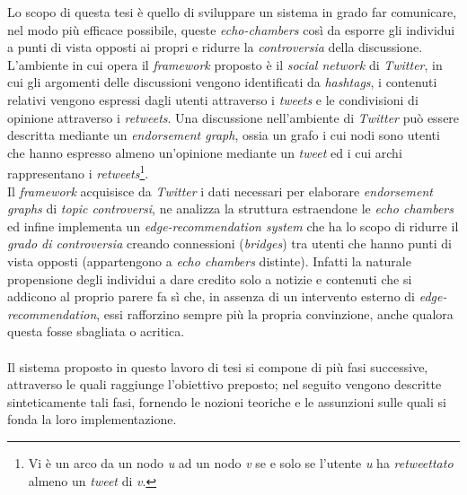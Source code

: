 Lo scopo di questa tesi è quello di sviluppare un sistema in grado far comunicare, nel modo più efficace possibile, queste \textit{echo-chambers} così da esporre gli individui a punti di vista opposti ai propri e ridurre la \textit{controversia} della discussione. L'ambiente in cui opera il \textit{framework} proposto è il \textit{social network} di \textit{Twitter}, in cui gli argomenti delle discussioni vengono identificati da \textit{hashtags}, i contenuti relativi vengono espressi dagli utenti attraverso i \textit{tweets} e le condivisioni di opinione attraverso i \textit{retweets}. Una discussione nell'ambiente di \textit{Twitter} può essere descritta mediante un \textit{endorsement graph}, ossia un grafo i cui nodi sono utenti che hanno espresso almeno un'opinione mediante un \textit{tweet} ed i cui archi rappresentano i \textit{retweets}\footnote{Vi è un arco da un nodo \textit{u} ad un nodo \textit{v} se e solo se l'utente \textit{u} ha \textit{retweettato} almeno un \textit{tweet} di \textit{v}.}.\\Il \textit{framework} acquisisce da \textit{Twitter} i dati necessari per elaborare \textit{endorsement graphs} di \textit{topic controversi}, ne analizza la struttura estraendone le \textit{echo chambers} ed infine implementa un \textit{edge-recommendation system} che ha lo scopo di ridurre il \textit{grado di controversia} creando connessioni (\textit{bridges}) tra utenti che hanno punti di vista opposti (appartengono a \textit{echo chambers} distinte). Infatti la naturale propensione degli individui a dare credito solo a notizie e contenuti che si addicono al proprio parere fa sì che, in assenza di un intervento esterno di \textit{edge-recommendation}, essi rafforzino sempre più la propria convinzione, anche qualora questa fosse sbagliata o acritica.\\\\Il sistema proposto in questo lavoro di tesi si compone di più fasi successive, attraverso le quali raggiunge l'obiettivo preposto; nel seguito vengono descritte sinteticamente tali fasi, fornendo le nozioni teoriche e le assunzioni sulle quali si fonda la loro implementazione.

